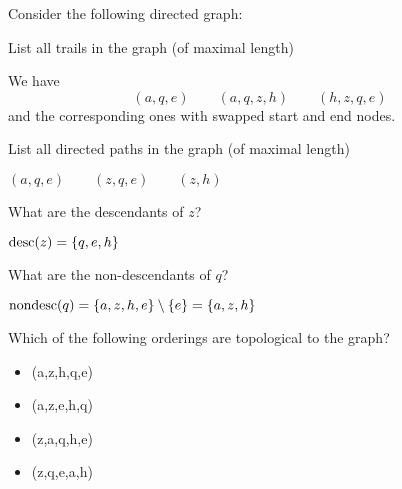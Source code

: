 
\label{ex:directed-graph-concepts}
Consider the following directed graph:

\begin{center}
  \end{center}

\begin{exenumerate}
\item List all trails in the graph (of maximal length)

  \begin{solution}
    We have
  $$(a,q,e) \quad \quad (a,q,z,h) \quad \quad  (h,z,q,e)$$
    and the corresponding ones with swapped start and end nodes.
  \end{solution}
    
\item List all directed paths in the graph (of maximal length)
  \begin{solution}
$(a,q,e) \quad \quad (z,q,e) \quad \quad (z,h) $
  \end{solution}
  
\item What are the descendants of $z$?
  
  \begin{solution}
$\textrm{desc}(z) =\{q,e,h\}$
  \end{solution}

  
\item What are the non-descendants of $q$?
    
  \begin{solution}
$\textrm{nondesc}(q) = \{a,z,h,e\} \setminus \{e\} = \{a,z,h\}$
  \end{solution}

  
\item Which of the following orderings are topological to the graph?
  \begin{itemize}
    \item (a,z,h,q,e)
    \item (a,z,e,h,q)
    \item (z,a,q,h,e)
    \item (z,q,e,a,h)
  \end{itemize}
  

\end{exenumerate}
